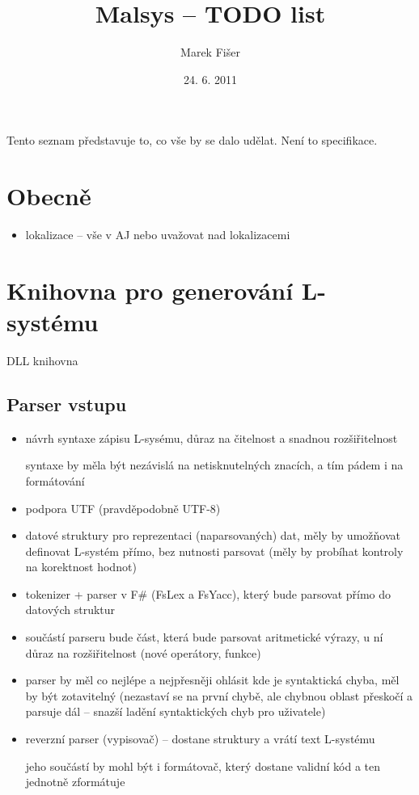 \documentclass[12pt, a4paper]{article}
\title{Malsys -- TODO list}
\author{Marek Fišer}
\date{24. 6. 2011}
\begin{document}
\maketitle

Tento seznam představuje to, co vše by se dalo udělat. Není to specifikace.


\section{Obecně}
\begin{itemize}
	\item lokalizace -- vše v AJ nebo uvažovat nad lokalizacemi
\end{itemize}


\section{Knihovna pro generování L-systému}
DLL knihovna

\subsection{Parser vstupu}
\begin{itemize}
	\item návrh syntaxe zápisu L-sysému, důraz na čitelnost a snadnou rozšiřitelnost
		
		syntaxe by měla být nezávislá na netisknutelných znacích, a tím pádem i na formátování
	
	\item podpora UTF (pravděpodobně UTF-8)

	\item datové struktury pro reprezentaci  (naparsovaných) dat, měly by umožňovat definovat L-systém přímo, bez nutnosti parsovat (měly by probíhat kontroly na korektnost hodnot)
	
	\item tokenizer + parser v F\# (FsLex a FsYacc), který bude parsovat přímo do datových struktur
	
	\item součástí parseru bude část, která bude parsovat aritmetické výrazy, u ní důraz na rozšiřitelnost (nové operátory, funkce)
	
	\item parser by měl co nejlépe a nejpřesněji ohlásit kde je syntaktická chyba, měl by být zotavitelný (nezastaví se na první chybě, ale chybnou oblast přeskočí a parsuje dál -- snazší ladění syntaktických chyb pro uživatele)
	
	\item reverzní parser (vypisovač) -- dostane struktury a vrátí text L-systému
	
		jeho součástí by mohl být i formátovač, který dostane validní kód a ten jednotně zformátuje
\end{itemize}
\end{document}
